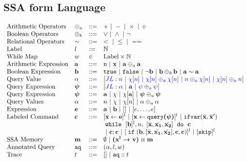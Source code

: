 \documentclass[a4paper,11pt]{article}
\begin{document}
\subsection{SSA form Language}
\[
\begin{array}{llll}
 \mbox{Arithmetic Operators} 
& \oplus_a & ::= & + ~|~ - ~|~ \times 
%
~|~ \div \\  
\mbox{Boolean Operators} 
& \oplus_b & ::= & \lor ~|~ \land ~|~ \neg
\\
\mbox{Relational Operators} 
& \sim & ::= & < ~|~ \leq ~|~ == 
\\  
%
\mbox{Label} 
& l & := & \mathbb{N} 
\\ 
%
\mbox{While Map} 
& w & \in & \mbox{Label} \times \mathbb{N} 
\\
%
\mbox{Arithmetic Expression} 
& \saexpr & ::= & 
\textrm{n} ~|~ \ssa{x} ~|~ \saexpr \oplus_a \saexpr  
\\
%
\mbox{Boolean Expression} & \sbexpr & ::= & 
	\etrue ~|~ \efalse  ~|~ \neg \sbexpr
	 ~|~ \sbexpr \oplus_b \sbexpr
	~|~ \saexpr \sim \saexpr 
	\\
%
\mbox{Query Value} & \qval & ::= 
& \jl{n ~|~ \chi[n] ~|~ \chi[n] \oplus_a  \chi[n] ~|~ n \oplus_a  \chi[n]
~|~ \chi[n] \oplus_a  n}
\\
%
\mbox{Query Expression} 
& \ssa{\qexpr} & ::= 
& \jl{ \qval ~|~ \saexpr ~|~ \qexpr \oplus_a \qexpr} 
\\
%
\mbox{Query Expression} & \ssa{\qexpr} & ::= 
& { \saexpr ~|~ \chi ~|~ \chi[\saexpr] ~|~ \ssa{\qexpr} \oplus_a \ssa{\qexpr}} 
\\
%
\mbox{Query Values} & \qval & ::= 
& { n ~|~ \chi ~|~ \chi[n] ~|~ \qval \oplus_a  \qval }
\\
%
\mbox{Expression} & \sexpr & ::= & \saexpr \sep \sbexpr ~|~ [] ~|~ [\expr, \dots, \expr]
\\	
%
\mbox{Labeled Command} 
& \ssa{c} & ::= &   [\assign {\ssa{x}}{ \ssa{\expr}}]^{l} ~|~  [\assign {\ssa{x} } {\ssa{\query(\qexpr)}}]^{l}
%
~|~  {{\eifvar(\bar{\ssa{x}}, \bar{\ssa{x}}')}} 
\\ 
&&& 
{\ewhile ~ [ \sbexpr ]^{l} , n,
~ 
[\bar{\ssa{x}}, \bar{\ssa{x_1}}, \bar{\ssa{x_2}}] 
~ \edo ~  \ssa{c} }
\\
&&&
~|~ \ssa{c};\ssa{c}  
~|~ [\eif(\sbexpr, [\bar{\ssa{x}}, \bar{\ssa{x_1}}, \bar{\ssa{x_2}}] , \ssa{c}, \ssa{c})]^l 
~|~ [\eskip]^{l} 
\\
%
\mbox{SSA Memory} 
& \ssa{m} & ::= & \emptyset ~|~ \ssa{ ({x^{l}} \to v) :: m } 
\\
%
\mbox{Annotated Query} 
& \aq & ::= & (\qval, l , w )
\\
%
\mbox{Trace} & t 
& ::= & [] ~|~ {\aq :: t}
\end{array}
\]
\end{document}

